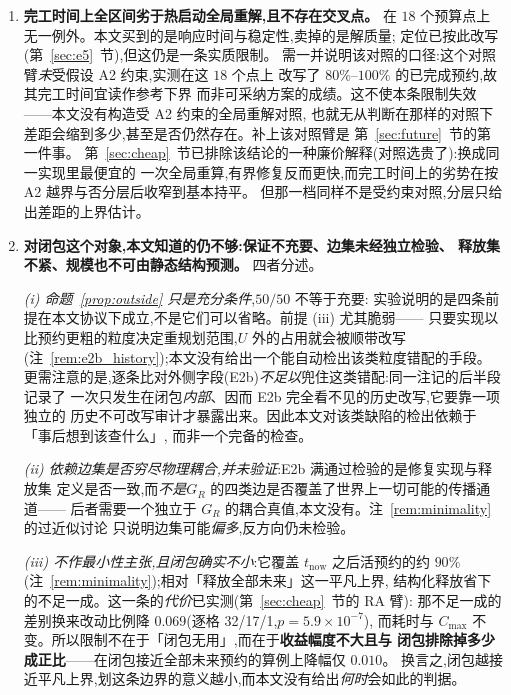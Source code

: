 \documentclass[manuscript,screen,review]{acmart}
\newcommand{\NPairs}{50}
\newcommand{\PassInvar}{\NPairs/\NPairs}     %
\newcommand{\RzeroPastLo}{80\%}
\newcommand{\RzeroPastHi}{100\%}
\newcommand{\ClosureAliveFrac}{90\%}
\newcommand{\RAStabWTL}{32/17/1}     %
\newcommand{\RAStabP}{5.9\times10^{-7}}  %
\newcommand{\RAStabMean}{0.069}      %
\begin{document}
\begin{enumerate}[leftmargin=1.6em,itemsep=0.35em]
\item \textbf{完工时间上全区间劣于热启动全局重解,且不存在交叉点。}
在 \(18\) 个预算点上无一例外。本文买到的是响应时间与稳定性,卖掉的是解质量;
定位已按此改写(第~\ref{sec:e5}~节),但这仍是一条实质限制。
需一并说明该对照的口径:这个对照臂\emph{未}受假设 A2 约束,实测在这 \(18\) 个点上
改写了 \(\RzeroPastLo\)--\(\RzeroPastHi\) 的已完成预约,故其完工时间宜读作参考下界
而非可采纳方案的成绩。这不使本条限制失效——本文没有构造受 A2 约束的全局重解对照,
也就无从判断在那样的对照下差距会缩到多少,甚至是否仍然存在。补上该对照臂是
第~\ref{sec:future}~节的第一件事。
第~\ref{sec:cheap}~节已排除该结论的一种廉价解释(对照选贵了):换成同一实现里最便宜的
一次全局重算,有界修复反而更快,而完工时间上的劣势在按 A2 越界与否分层后收窄到基本持平。
但那一档同样不是受约束对照,分层只给出差距的上界估计。

\item \textbf{对闭包这个对象,本文知道的仍不够:保证不充要、边集未经独立检验、
释放集不紧、规模也不可由静态结构预测。} 四者分述。

\emph{(i) 命题~\ref{prop:outside} 只是充分条件},\(\PassInvar\) 不等于充要:
实验说明的是四条前提在本文协议下成立,不是它们可以省略。前提 (iii) 尤其脆弱——
只要实现以比预约更粗的粒度决定重规划范围,\(U\) 外的占用就会被顺带改写
(注~\ref{rem:e2b_history});本文没有给出一个能自动检出该类粒度错配的手段。
更需注意的是,逐条比对外侧字段(E2b)\emph{不足以}兜住这类错配:同一注记的后半段记录了
一次只发生在闭包\emph{内部}、因而 E2b 完全看不见的历史改写,它要靠一项独立的
历史不可改写审计才暴露出来。因此本文对该类缺陷的检出依赖于「事后想到该查什么」,
而非一个完备的检查。

\emph{(ii) 依赖边集是否穷尽物理耦合,并未验证}:E2b 满通过检验的是修复实现与释放集
定义是否一致,而\emph{不是}\(G_R\) 的四类边是否覆盖了世界上一切可能的传播通道——
后者需要一个独立于 \(G_R\) 的耦合真值,本文没有。注~\ref{rem:minimality} 的过近似讨论
只说明边集可能\emph{偏多},反方向仍未检验。

\emph{(iii) 不作最小性主张,且闭包确实不小}:它覆盖 \(t_{\mathrm{now}}\) 之后活预约的约
\(\ClosureAliveFrac\)(注~\ref{rem:minimality});相对「释放全部未来」这一平凡上界,
结构化释放省下的不足一成。这一条的\emph{代价}已实测(第~\ref{sec:cheap}~节的 RA 臂):
那不足一成的差别换来改动比例降 \RAStabMean(逐格 \RAStabWTL,\(p=\RAStabP\)),
而耗时与 \(C_{\max}\) 不变。所以限制不在于「闭包无用」,而在于\textbf{收益幅度不大且与
闭包排除掉多少成正比}——在闭包接近全部未来预约的算例上降幅仅 \(0.010\)。
换言之,闭包越接近平凡上界,划这条边界的意义越小,而本文没有给出\emph{何时}会如此的判据。


\end{enumerate}
\end{document}
